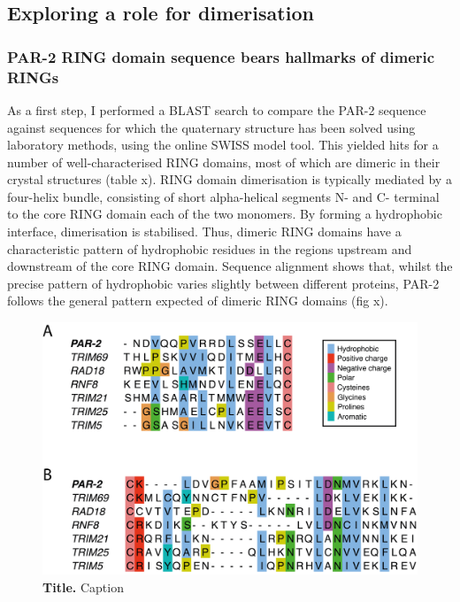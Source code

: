\documentclass[12pt]{"article"}
\newcommand{\mycaption}[2]{\caption[#1]{\textbf{#1.} #2}}
\begin{document}
\clearpage
\subsection{Exploring a role for dimerisation}

\subsubsection{PAR-2 RING domain sequence bears hallmarks of dimeric RINGs}

As a first step, I performed a BLAST search to compare the PAR-2 sequence against sequences for which the quaternary structure has been solved using laboratory methods, using the online SWISS model tool. This yielded hits for a number of well-characterised RING domains, most of which are dimeric in their crystal structures (table x). RING domain dimerisation is typically mediated by a four-helix bundle, consisting of short alpha-helical segments N- and C- terminal to the core RING domain each of the two monomers. By forming a hydrophobic interface, dimerisation is stabilised. Thus, dimeric RING domains have a characteristic pattern of hydrophobic residues in the regions upstream and downstream of the core RING domain. Sequence alignment shows that, whilst the precise pattern of hydrophobic varies slightly between different proteins, PAR-2 follows the general pattern expected of dimeric RING domains (fig x).\\

\begin{figure}[!h]
\includegraphics[scale=1]{alignments_other_rings}
\setlength{\abovecaptionskip}{20pt}
\centering
\mycaption{Title}{Caption}
\label{fig:alignments_other_rings}
\end{figure}
\end{document}
